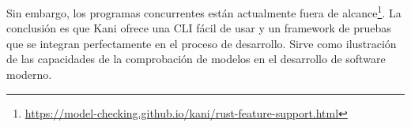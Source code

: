 Sin embargo, los programas concurrentes están actualmente fuera de alcance\footnote{\url{https://model-checking.github.io/kani/rust-feature-support.html}}.
La conclusión es que Kani ofrece una \acrshort{CLI} fácil de usar y un framework de pruebas que se integran perfectamente en
el proceso de desarrollo. Sirve como ilustración de las capacidades de la comprobación de
modelos en el desarrollo de software moderno.